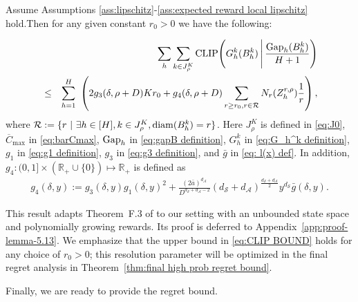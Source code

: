 \documentclass[final,supplement]{siamart251216}
\begin{document}
\begin{lemma}\label{lemma:theorem F.3 conclusion}
    Assume Assumptions \ref{ass:lipschitz}-\ref{ass:expected reward local lipschitz} hold.Then for any given constant $r_{0}>0$ we have the following: %
    
    \begin{eqnarray}\label{eq:CLIP BOUND}
        &&\sum_{h}\sum_{k\in J_{\rho}^{K}}{\rm CLIP}\Bigg(G_h^k(B_h^k)\,\Bigg|\,\frac{{\rm Gap}_{h}(B_h^k)}{H+1}\Bigg) \nonumber\\
       &\leq& \sum_{h=1}^{H}\,\,\left(2g_{3}(\delta,\rho+D)Kr_{0}+g_{4}(\delta,\rho+D)\sum_{r \geq r_{0}, r\in \mathcal{R}}N_{r}(Z_{h}^{r,\rho})\frac{1}{r}\right),
    \end{eqnarray}
where $\mathcal{R}:=\{r\,\,|\,\,\exists h \in [H], k \in J_{\rho}^{K}, {\rm diam}(B_h^k)=r\}$. Here $J_{\rho}^{K}$ is defined in \eqref{eq:J0}, $\overline{C}_{\max}$  in \eqref{eq:barCmax}, ${\rm Gap}_h$  in \eqref{eq:gapB definition}, $G_{h}^{k}$  in \eqref{eq:G_h^k definition}, $g_1$ in \eqref{eq:g1 definition}, $g_{3}$ in \eqref{eq:g3 definition}, and $\bar{g}$  in \eqref{eq: l(x) def}. In addition, $g_{4}:(0,1]\times (\mathbb{R}_+\cup\{0\})\mapsto \mathbb{R}_+ $ is defined  as 
    \begin{eqnarray}\label{eq:g4 definition}
   g_{4}(\delta,y):=g_{3}(\delta,y)g_{1}(\delta,y)^2+\frac{(2\bar{a})^{d_{\mathcal{A}}}}{D^{d_{\mathcal{S}}+d_{\mathcal{A}}-2}}(d_{\mathcal{S}}+d_{\mathcal{A}})^{\frac{d_{\mathcal{S}}+d_{\mathcal{A}}}{2}}y^{d_{\mathcal{S}}}\bar{g}(\delta, y). 
    \end{eqnarray}
    \end{lemma}
This result adapts Theorem~F.3 of \cite{sinclair2023adaptive} to our
setting with an unbounded state space and polynomially growing rewards. Its proof is deferred to Appendix~\ref{app:proof-lemma-5.13}. We emphasize
that the upper bound in \eqref{eq:CLIP BOUND} holds for any choice of
\(r_0>0\); this resolution parameter will be optimized in the final regret
analysis in Theorem~\ref{thm:final high prob regret bound}.



Finally, we are ready to provide the regret bound. 
\end{document}
